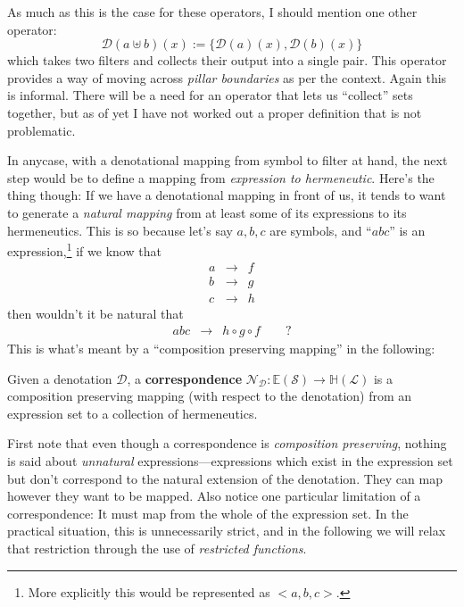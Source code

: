 \documentclass[twoside]{article}
\newenvironment{definition}[1][Definition]{\begin{trivlist}
\item[\hskip \labelsep {\bfseries #1:}]}{\end{trivlist}}
\begin{document}
As much as this is the case for these operators, I should mention one other operator:
$$ \mathcal{D}(a\uplus b)(x):=\{\mathcal{D}(a)(x), \mathcal{D}(b)(x)\} $$
which takes two filters and collects their output into a single pair. This operator provides a way of moving
across \emph{pillar boundaries} as per the context. Again this is informal. There will be a need for an operator
that lets us ``collect'' sets together, but as of yet I have not worked out a proper definition that is not problematic.

In anycase, with a denotational mapping from symbol to filter at hand, the next step would be to define a mapping from
\emph{expression to hermeneutic}.  Here's the thing though: If we have a denotational mapping in front of us, it tends
to want to generate a \emph{natural mapping} from at least some of its expressions to its hermeneutics. This is so because
let's say $ a,b,c $ are symbols, and ``$ abc $'' is an expression,\footnote{More explicitly this would be represented as
$ <a,b,c> $.} if we know that
\begin{eqnarray*}
a & \to & f \\
b & \to & g \\
c & \to & h
\end{eqnarray*}
then wouldn't it be natural that
\begin{eqnarray*}
abc & \to & h\circ g\circ f\qquad\mbox{?}
\end{eqnarray*}
This is what's meant by a ``composition preserving mapping'' in the following:

\begin{definition}[Media Space - Semiotics]

Given a denotation $ \mathcal{D} $, a {\bfseries correspondence}
$ \mathcal{N}_{\mathcal{D}}:\mathbb{E}(\mathcal{S})\to\mathbb{H}(\mathcal{L}) $ is a composition preserving mapping
(with respect to the denotation) from an expression set to a collection of hermeneutics.

\end{definition}

First note that even though a correspondence is \emph{composition preserving}, nothing is said about \emph{unnatural}
expressions---expressions which exist in the expression set but don't correspond to the natural extension of the denotation.
They can map however they want to be mapped.  Also notice one particular limitation of a correspondence: It must map from
the whole of the expression set.  In the practical situation, this is unnecessarily strict, and in the following we will
relax that restriction through the use of \emph{restricted functions}.
\end{document}
